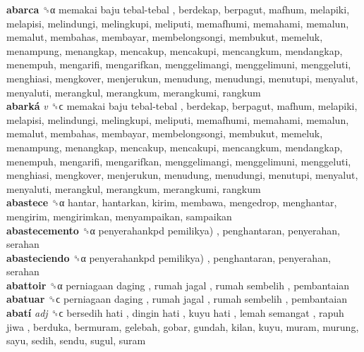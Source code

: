 \textbf{abarca} ␝α   memakai baju tebal-tebal , berdekap, berpagut, mafhum, melapiki, melapisi, melindungi, melingkupi, meliputi, memafhumi, memahami, memalun, memalut, membahas, membayar, membelongsongi, membukut, memeluk, menampung, menangkap, mencakup, mencakupi, mencangkum, mendangkap, menempuh, mengarifi, mengarifkan, menggelimangi, menggelimuni, menggeluti, menghiasi, mengkover, menjerukun, menudung, menudungi, menutupi, menyalut, menyaluti, merangkul, merangkum, merangkumi, rangkum  \\
\textbf{abarká} \emph{v}  ␝ϲ   memakai baju tebal-tebal , berdekap, berpagut, mafhum, melapiki, melapisi, melindungi, melingkupi, meliputi, memafhumi, memahami, memalun, memalut, membahas, membayar, membelongsongi, membukut, memeluk, menampung, menangkap, mencakup, mencakupi, mencangkum, mendangkap, menempuh, mengarifi, mengarifkan, menggelimangi, menggelimuni, menggeluti, menghiasi, mengkover, menjerukun, menudung, menudungi, menutupi, menyalut, menyaluti, merangkul, merangkum, merangkumi, rangkum  \\
\textbf{abastece} ␝α  hantar, hantarkan, kirim, membawa, mengedrop, menghantar, mengirim, mengirimkan, menyampaikan, sampaikan  \\
\textbf{abastecemento} ␝α   penyerahankpd pemilikya) , penghantaran, penyerahan, serahan  \\
\textbf{abasteciendo} ␝α   penyerahankpd pemilikya) , penghantaran, penyerahan, serahan  \\
\textbf{abattoir} ␝α   perniagaan daging ,  rumah jagal ,  rumah sembelih , pembantaian  \\
\textbf{abatuar} ␝ϲ   perniagaan daging ,  rumah jagal ,  rumah sembelih , pembantaian  \\
\textbf{abatí} \emph{adj}  ␝ϲ   bersedih hati ,  dingin hati ,  kuyu hati ,  lemah semangat ,  rapuh jiwa , berduka, bermuram, gelebah, gobar, gundah, kilan, kuyu, muram, murung, sayu, sedih, sendu, sugul, suram  \\
